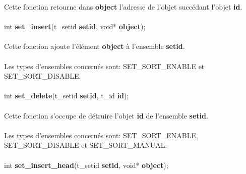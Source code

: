 \documentclass[10pt,a4wide]{article}
\begin{document}
Cette fonction retourne dans \textbf{object} l'adresse de l'objet
succ\'edant l'objet \textbf{id}.

\paragraph{}

\hspace{1.5cm}int \textbf{set\_insert}(t\_setid \textbf{setid},
                                       void* \textbf{object});

\paragraph{}

Cette fonction ajoute l'\'el\'ement \textbf{object} \`a l'ensemble
\textbf{setid}.

\paragraph{}

Les types d'ensembles concern\'es sont: SET\_SORT\_ENABLE et
SET\_SORT\_DISABLE.

\paragraph{}

\hspace{1.5cm}int \textbf{set\_delete}(t\_setid \textbf{setid},
                                       t\_id \textbf{id});

\paragraph{}

Cette fonction s'occupe de d\'etruire l'objet \textbf{id} de l'ensemble
\textbf{setid}.

\paragraph{}

Les types d'ensembles concern\'es sont: SET\_SORT\_ENABLE,
SET\_SORT\_DISABLE et SET\_SORT\_MANUAL.

\paragraph{}

\hspace{1.5cm}int \textbf{set\_insert\_head}(t\_setid \textbf{setid},
                                             void* \textbf{object});
\end{document}
